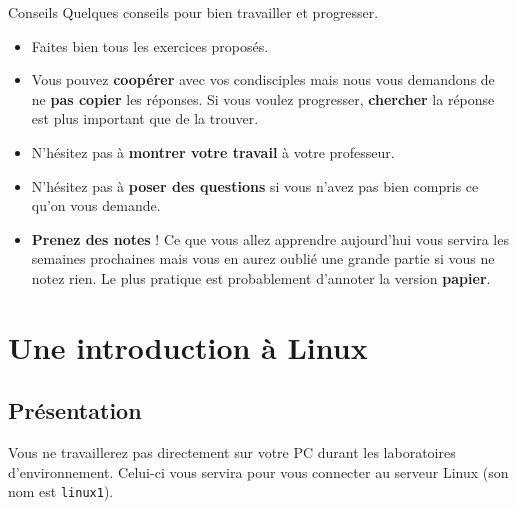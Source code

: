 \documentclass[a4paper,11pt]{style-esi/td}
\begin{document}
\entete
\titre
{}
\lastedit

\bigskip
\tableofcontents

\vfill
\begin{coltbox}{Conseils}
	Quelques conseils pour bien travailler et progresser.
	\begin{itemize}
	\item 
		Faites bien tous les exercices proposés.
	\item 
		Vous pouvez \textbf{coopérer} avec vos condisciples 
		mais nous vous demandons de ne \textbf{pas copier} les réponses. 
		Si vous voulez progresser, \textbf{chercher} la réponse est plus important que de la trouver. 
	\item 
		N'hésitez pas à \textbf{montrer votre travail} à votre professeur.
	\item 
		N'hésitez pas à \textbf{poser des questions} 
		si vous n'avez pas bien compris ce qu'on vous demande.
	\item 
		\textbf{Prenez des notes} ! 
		Ce que vous allez apprendre aujourd'hui 
		vous servira les semaines prochaines 
		mais vous en aurez oublié une grande partie si vous ne notez rien. 
		Le plus pratique est probablement d'annoter la version \textbf{papier}. 
	\end{itemize}
\end{coltbox}
\vfill
	
\newpage
\section{Une introduction à Linux}


	\subsection{Présentation}

		Vous ne travaillerez pas directement sur votre PC durant les laboratoires d'environnement. 
		Celui-ci vous servira pour vous connecter au serveur Linux
		(son nom est \verb_linux1_).
\end{document}
